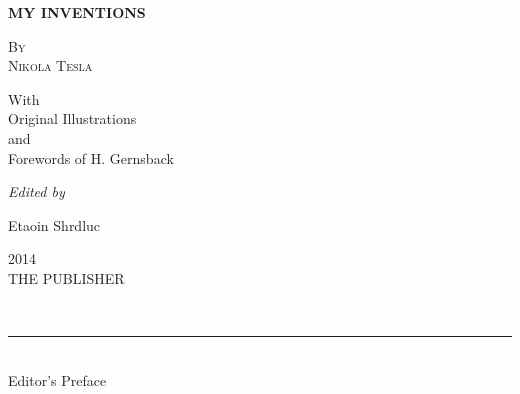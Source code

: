 \documentclass[a4paper,12pt,english,twoside,openright]{memoir}
\begin{document}
\thispagestyle{empty}
{ 
\centering 
\vspace*{2cm}
{\HUGE 	\bfseries
	MY INVENTIONS\\[\baselineskip] 
}

\vspace*{.3cm}

\scshape 
{\Large
	By\\ \textsc{Nikola Tesla} \\
} 
\vspace*{1cm}

With\\ Original Illustrations\\ and\\ 
Forewords of H. Gernsback\\[\baselineskip]


\vspace*{4\baselineskip}

\emph{Edited by} \\
{\large Etaoin Shrdluc\par} 

\vfill %

{\scshape 2014} \\[0.3\baselineskip] 
{\large THE PUBLISHER}\par 
\vspace{1.5cm}
}

\newpage
\clearforchapter		

\tableofcontents*
\newpage
\clearforchapter	

\thispagestyle{empty}
\markright{}
\vspace*{5em}
\begin{center}
	\bfseries
	\\
	\noindent\rule{.5\linewidth}{1pt}\\
	\medskip
	{\noindent\LARGE Editor's Preface}
		\par
	
	\vspace*{5em}
\end{center}
\end{document}

